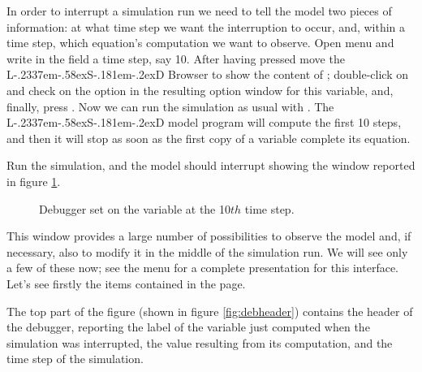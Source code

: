 \documentclass [11pt,a4paper] {book}
\def\LsD{{L\kern-.2337em\lower-.58ex\hbox{S}\kern-.181em\lower-.2ex\hbox{D}}\xspace}
\begin{document}
In order to interrupt a simulation run we need to tell the model two pieces of
information: at what time step we want the interruption to occur, and, within a time
step, which equation's computation we want to observe. Open menu 
and write in the field  a time step, say 10. After having
pressed  move the \LsD Browser to show the content of ; double-click
on  and check on the option  in the resulting option window
for this variable, and, finally, press . Now we can run the simulation as
usual with . The \LsD model program will compute the first 10 steps, and
then it will stop as soon as the first copy of a variable  complete its equation. 

Run the simulation, and the model should interrupt showing the window reported in figure
\ref{fig:debugger}.


\begin{figure}[ht]
  \centering
  \caption{Debugger set on the variable  at the 10${th}$ time step.}
  \label{fig:debugger}
\end{figure}

This window provides a large number of possibilities to observe the model and, if
necessary, also to modify it in the middle of the simulation run. We will see only a few
of these now; see the menu \menu{Help/\LsD Debugger Help} for a complete
presentation for this interface. Let's see firstly the items contained in the page.

The top part of the figure (shown in figure \ref{fig:debheader}) contains the header of
the debugger, reporting the label of the variable just computed when the simulation was interrupted, the value resulting
from its computation, and the time step of the simulation.
\end{document}
